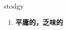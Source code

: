 
\begin{frame}
{\huge stodgy}
\begin{center}
\begin{enumerate}\Large
  \item \textbf{平庸的，乏味的}
\end{enumerate}
\end{center}
\end{frame}
